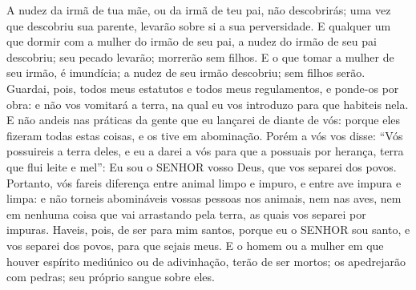 {{  A nudez da irmã de tua mãe, ou da irmã de teu pai, não descobrirás; uma vez que descobriu sua parente, levarão sobre si a sua perversidade. %
  E qualquer um que dormir com a mulher do irmão de seu pai, a nudez do irmão de seu pai descobriu; seu pecado levarão; morrerão sem filhos.
  E o que tomar a mulher de seu irmão, é imundícia; a nudez de seu irmão descobriu; sem filhos serão.
  Guardai, pois, todos meus estatutos e todos meus regulamentos, e ponde-os por obra: e não vos vomitará a terra, na qual eu vos introduzo para que habiteis nela.
  E não andeis nas práticas da gente que eu lançarei de diante de vós: porque eles fizeram todas estas coisas, e os tive em abominação.
  Porém a vós vos disse: \enquote{Vós possuireis a terra deles, e eu a darei a vós para que a possuais por herança, terra que flui leite e mel}: Eu sou o SENHOR vosso Deus, que vos separei dos povos.
  Portanto, vós fareis diferença entre animal limpo e impuro, e entre ave impura e limpa: e não torneis abomináveis vossas pessoas nos animais, nem nas aves, nem em nenhuma coisa que vai arrastando pela terra, as quais vos separei por impuras.
  Haveis, pois, de ser para mim santos, porque eu o SENHOR sou santo, e vos separei dos povos, para que sejais meus.
  E o homem ou a mulher em que houver espírito mediúnico ou de adivinhação, terão de ser mortos; os apedrejarão com pedras; seu próprio sangue
{} sobre eles}.
\par }

